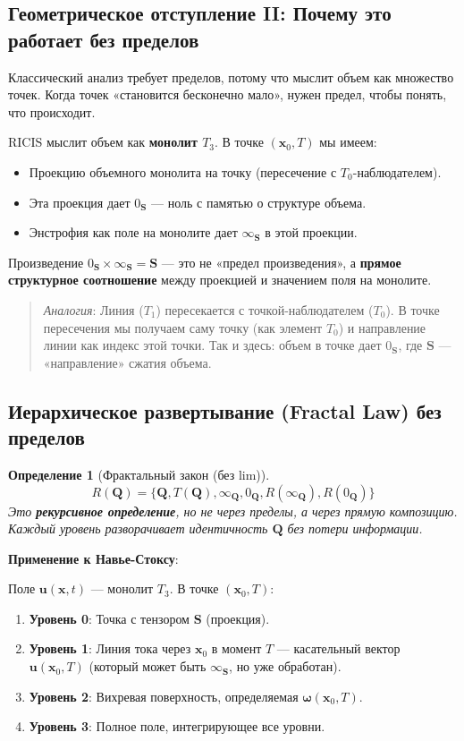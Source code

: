 \documentclass[12pt]{article}
\newtheorem{definition}{Определение}
\newcommand{\0}{\mathbf{0}}
\newcommand{\1}{\mathds{1}}
\newcommand{\bu}{\mathbf{u}}
\newcommand{\bomega}{\bm{\omega}}
\newcommand{\bx}{\mathbf{x}}
\newcommand{\bS}{\mathbf{S}}
\begin{document}
\subsection{Геометрическое отступление II: Почему это работает без пределов}

Классический анализ требует пределов, потому что мыслит объем как множество точек. Когда точек «становится бесконечно мало», нужен предел, чтобы понять, что происходит.

RICIS мыслит объем как \textbf{монолит $T_3$}. В точке $(\bx_0,T)$ мы имеем:
\begin{itemize}
    \item Проекцию объемного монолита на точку (пересечение с $T_0$-наблюдателем).
    \item Эта проекция дает $0_{\bS}$ --- ноль с памятью о структуре объема.
    \item Энстрофия как поле на монолите дает $\infty_{\bS}$ в этой проекции.
\end{itemize}

Произведение $0_{\bS} \times \infty_{\bS} = \bS$ --- это не «предел произведения», а \textbf{прямое структурное соотношение} между проекцией и значением поля на монолите.

\begin{quote}
\textit{Аналогия}: Линия ($T_1$) пересекается с точкой-наблюдателем ($T_0$). В точке пересечения мы получаем саму точку (как элемент $T_0$) и направление линии как индекс этой точки. Так и здесь: объем в точке дает $0_{\bS}$, где $\bS$ --- «направление» сжатия объема.
\end{quote}

\subsection{Иерархическое развертывание (Fractal Law) без пределов}

\begin{definition}[Фрактальный закон (без lim)]
\[
R(\mathbf{Q}) = \{\mathbf{Q}, T(\mathbf{Q}), \infty_{\mathbf{Q}}, 0_{\mathbf{Q}}, R(\infty_{\mathbf{Q}}), R(0_{\mathbf{Q}})\}
\]
Это \textbf{рекурсивное определение}, но не через пределы, а через прямую композицию. Каждый уровень разворачивает идентичность $\mathbf{Q}$ без потери информации.
\end{definition}

\textbf{Применение к Навье-Стоксу}:

Поле $\bu(\bx,t)$ --- монолит $T_3$. В точке $(\bx_0,T)$:
\begin{enumerate}
    \item \textbf{Уровень 0}: Точка с тензором $\bS$ (проекция).
    \item \textbf{Уровень 1}: Линия тока через $\bx_0$ в момент $T$ --- касательный вектор $\bu(\bx_0,T)$ (который может быть $\infty_{\bS}$, но уже обработан).
    \item \textbf{Уровень 2}: Вихревая поверхность, определяемая $\bomega(\bx_0,T)$.
    \item \textbf{Уровень 3}: Полное поле, интегрирующее все уровни.
\end{enumerate}
\end{document}
